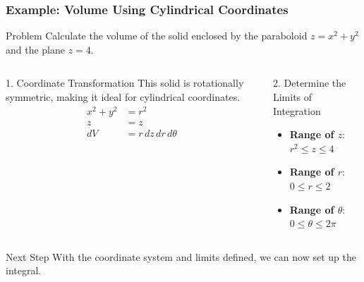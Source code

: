 \documentclass[aspectratio=169, UTF8]{beamer}
\begin{document}
\begin{frame}
    \frametitle{Example: Volume Using Cylindrical Coordinates}

    \begin{block}{Problem}
        Calculate the volume of the solid enclosed by the paraboloid $z = x^2 + y^2$ and the plane $z = 4$.
    \end{block}

    \begin{columns}[T]
        \begin{column}{0.5\textwidth}
            \begin{block}{1. Coordinate Transformation}
                This solid is rotationally symmetric, making it ideal for cylindrical coordinates.
                \begin{align*}
                    x^2 + y^2 & = r^2                      \\
                    z         & = z                        \\
                    dV        & = r \, dz \, dr \, d\theta
                \end{align*}
            \end{block}
        \end{column}

        \begin{column}{0.5\textwidth}
            \begin{block}{2. Determine the Limits of Integration}
                \begin{itemize}
                    \item \textbf{Range of $z$}: \\ $r^2 \le z \le 4$
                    \item \textbf{Range of $r$}: \\ $0 \le r \le 2$
                    \item \textbf{Range of $\theta$}: \\ $0 \le \theta \le 2\pi$
                \end{itemize}
            \end{block}
        \end{column}
    \end{columns}

    \begin{alertblock}{Next Step}
        With the coordinate system and limits defined, we can now set up the integral.
    \end{alertblock}
\end{frame}
\end{document}
